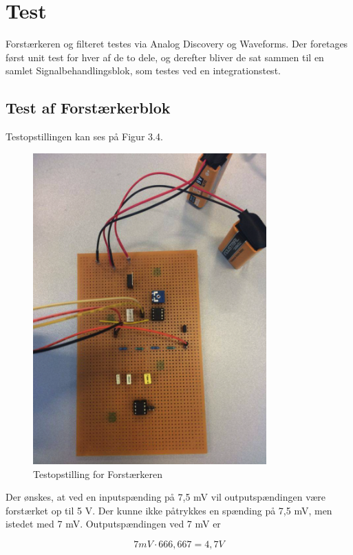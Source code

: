 \section{Test}
Forstærkeren og filteret testes via Analog Discovery og Waveforms. Der foretages først unit test for hver af de to dele, og derefter bliver de sat sammen til en samlet Signalbehandlingsblok, som testes ved en integrationstest.\\ 

\subsection{Test af Forstærkerblok}
Testopstillingen kan ses på Figur 3.4. 

\begin{figure}[H]
	\centering
	\includegraphics[width=0.8\textwidth]{Figurer/Snip20151207_35}
	\caption{Testopstilling for Forstærkeren}
\end{figure}

Der ønskes, at ved en inputspænding på 7,5 mV vil outputspændingen være forstærket op til 5 V. Der kunne ikke påtrykkes en spænding på 7,5 mV, men istedet med 7 mV. Outputspændingen ved 7 mV er 

\begin{equation}
	7 mV \cdot 666,667 = 4,7 V
\end{equation} 

